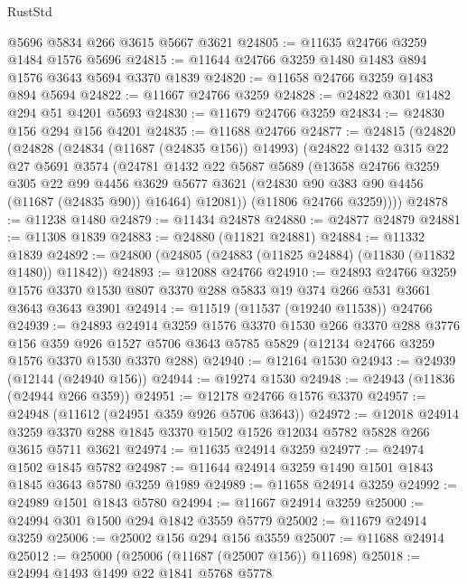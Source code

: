 \begin{lexlean}{RustStd}
\begin{coremodule}
    @5696
    @5834
    @266
    @3615
    @5667
    @3621
@24805 := @11635 @24766 @3259 @1484 @1576 @5696
@24815 := @11644 @24766 @3259 @1480 @1483 @894 @1576 @3643 @5694 @3370 @1839
@24820 := @11658 @24766 @3259 @1483 @894 @5694
@24822 := @11667 @24766 @3259
@24828 := @24822 @301 @1482 @294 @51 @4201 @5693
@24830 := @11679 @24766 @3259
@24834 := @24830 @156 @294 @156 @4201
@24835 := @11688 @24766
@24877 := @24815
    (@24820
      (@24828
        (@24834 (@11687 (@24835 @156)) @14993)
        (@24822
          @1432
          @315
          @22
          @27
          @5691
          @3574
          (@24781
            @1432
            @22
            @5687
            @5689
            (@13658
              @24766
              @3259
              @305
              @22
              @99
              @4456
              @3629
              @5677
              @3621
              (@24830 @90 @383 @90 @4456 (@11687 (@24835 @90)) @16464)
              @12081))
          (@11806 @24766 @3259))))
@24878 := @11238 @1480
@24879 := @11434 @24878
@24880 := @24877 @24879
@24881 := @11308 @1839
@24883 := @24880 (@11821 @24881)
@24884 := @11332 @1839
@24892 := @24800 (@24805 (@24883 (@11825 @24884) (@11830 (@11832 @1480)) @11842))
@24893 := @12088 @24766
@24910 := @24893
    @24766
    @3259
    @1576
    @3370
    @1530
    @807
    @3370
    @288
    @5833
    @19
    @374
    @266
    @531
    @3661
    @3643
    @3643
    @3901
@24914 := @11519 (@11537 (@19240 @11538)) @24766
@24939 := @24893
    @24914
    @3259
    @1576
    @3370
    @1530
    @266
    @3370
    @288
    @3776
    @156
    @359
    @926
    @1527
    @5706
    @3643
    @5785
    @5829
    (@12134 @24766 @3259 @1576 @3370 @1530 @3370 @288)
@24940 := @12164 @1530
@24943 := @24939 (@12144 (@24940 @156))
@24944 := @19274 @1530
@24948 := @24943 (@11836 (@24944 @266 @359))
@24951 := @12178 @24766 @1576 @3370
@24957 := @24948 (@11612 (@24951 @359 @926 @5706 @3643))
@24972 := @12018
    @24914
    @3259
    @3370
    @288
    @1845
    @3370
    @1502
    @1526
    @12034
    @5782
    @5828
    @266
    @3615
    @5711
    @3621
@24974 := @11635 @24914 @3259
@24977 := @24974 @1502 @1845 @5782
@24987 := @11644 @24914 @3259 @1490 @1501 @1843 @1845 @3643 @5780 @3259 @1989
@24989 := @11658 @24914 @3259
@24992 := @24989 @1501 @1843 @5780
@24994 := @11667 @24914 @3259
@25000 := @24994 @301 @1500 @294 @1842 @3559 @5779
@25002 := @11679 @24914 @3259
@25006 := @25002 @156 @294 @156 @3559
@25007 := @11688 @24914
@25012 := @25000 (@25006 (@11687 (@25007 @156)) @11698)
@25018 := @24994 @1493 @1499 @22 @1841 @5768 @5778

\end{coremodule}
\end{lexlean}

